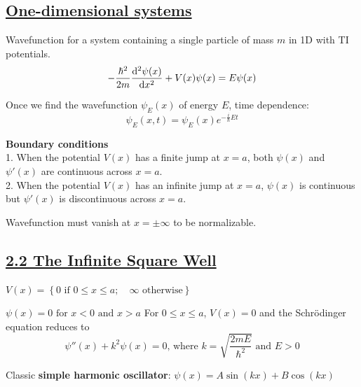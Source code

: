 
\subsection{\underline{One-dimensional systems}}
Wavefunction for a system containing a single particle of mass $m$ in 1D with TI potentials.
    $$- \frac{\hbar^2}{2m} \dv[2]{\psi(x)}{x} + V(x) \psi(x) = E \psi(x)$$

Once we find the wavefunction $\psi_E(x)$ of energy $E$, time dependence:
    $$\psi_E(x, t) = \psi_E(x) e^{-\frac{i}{\hbar} E t}$$

\textbf{Boundary conditions} \\
1. When the potential $V(x)$ has a finite jump at $x = a$, both $\psi(x)$ and $\psi'(x)$ are continuous across $x = a$. \\
2. When the potential $V(x)$ has an infinite jump at $x = a$, $\psi(x)$ is continuous but $\psi'(x)$ is discontinuous across $x = a$.

Wavefunction must vanish at $x = \pm \infty$ to be normalizable.

\subsection{\underline{2.2 The Infinite Square Well}}

$V(x) = \left\{ 0 \textrm{ if } 0 \leq x \leq a; \quad \infty \textrm{ otherwise} \right\}$


$\psi(x) = 0 \textrm{ for } x < 0 \textrm{ and } x > a$
For $0 \leq x \leq a$, $V(x) = 0$ and the Schr\"odinger equation reduces to 
    $$\psi''(x) + k^2 \psi(x) = 0 \textrm{, where } k = \sqrt{\frac{2mE}{\hbar^2}} \textrm{ and } E > 0$$

Classic \textbf{simple harmonic oscillator}: $\psi(x) = A \sin(kx) + B \cos(kx)$ \\

